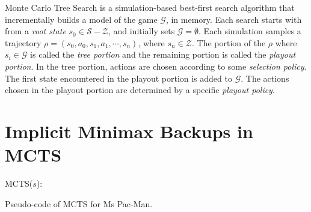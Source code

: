 \documentclass{article}
\newcommand{\pushline}{\Indp}%
\newcommand{\popline}{\Indm}
\newcommand{\cG}{\mathcal{G}}
\newcommand{\cS}{\mathcal{S}}
\newcommand{\cZ}{\mathcal{Z}}
\begin{document}
Monte Carlo Tree Search is a simulation-based best-first search algorithm that incrementally builds a model of the game 
$\cG$, in memory. Each search starts with from a {\it root state} $s_0 \in \cS - \cZ$, and initially sets $\cG = \emptyset$. 
Each simulation samples a trajectory $\rho = (s_0, a_0, s_1, a_1, \cdots, s_n)$, where $s_n \in \cZ$. 
The portion of the $\rho$ where $s_i \in \cG$ is called the {\it tree portion} and the remaining portion is
called the {\it playout portion}. In the tree portion, actions are chosen according to some {\it selection policy}. 
The first state encountered in the playout portion is added to $\cG$. The actions chosen in the playout portion are 
determined by a specific {\it playout policy}. 




\section{Implicit Minimax Backups in MCTS}

\begin{algorithm2e}[h!]
  MCTS($s$):\;
  \pushline
    
               \label{alg:checkdepth}
    \ElseIf{ExpandableNode$(p,l)$}{                           \label{alg:expandstart}
      \For{$c \in C(p)$}{                                       \label{alg:oldnewstart}
        $c \gets $NewLeafNode() \;                              
        Add new leaf $c$ to the tree\;                          \label{alg:oldnewend}
      }
      $(R,c') \gets \mbox{Play-out}(p)$\;
      Update$(c,R)$; Update$(p,R)$ \;
      {\bf return} $(p,R)$                            \label{alg:expandend}
    }
  \popline
  \vspace{0.3cm}
  \caption{Pseudo-code of MCTS for Ms Pac-Man. \label{alg}}
\end{algorithm2e}






\end{document}
